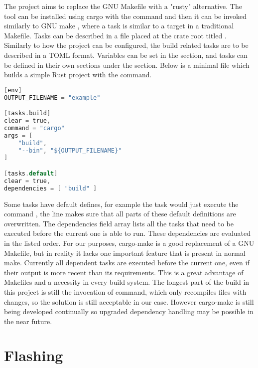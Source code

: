 The  \cite{CargoMake} project aims to replace the GNU Makefile with a "rusty" alternative. The tool can be installed using cargo with the command  and then it can be invoked similarly to GNU make , where a task is similar to a target in a traditional Makefile. Tasks can be described in a file placed at the crate root titled . Similarly to how the project can be configured, the build related tasks are to be described in a TOML format. Variables can be set in the \mycode{[env]} section, and tasks can be defined in their own sections under the  section. Below is a minimal  file which builds a simple Rust project with the  command.

\begin{lstlisting}[language=C,frame=single,float=!ht,label={lst:cargo-task-example},caption={Cargo Make Task Example}]
[env]
OUTPUT_FILENAME = "example"

[tasks.build]
clear = true,
command = "cargo"
args = [
    "build",
    "--bin", "${OUTPUT_FILENAME}"
]

[tasks.default]
clear = true,
dependencies = [ "build" ]
\end{lstlisting}

Some tasks have default defines, for example the  task would just execute the command , the  line makes sure that all parts of these default definitions are overwritten. The dependencies field array lists all the tasks that need to be executed before the current one is able to run. These dependencies are evaluated in the listed order. For our purposes, cargo-make is a good replacement of a GNU Makefile, but in reality it lacks one important feature that is present in normal make. Currently all dependent tasks are executed before the current one, even if their output is more recent than its requirements. This is a great advantage of Makefiles and a necessity in every build system. The longest part of the build in this project is still the invocation of  command, which only recompiles files with changes, so the solution is still acceptable in our case. However cargo-make is still being developed continually so upgraded dependency handling may be possible in the near future.

\section{Flashing}

